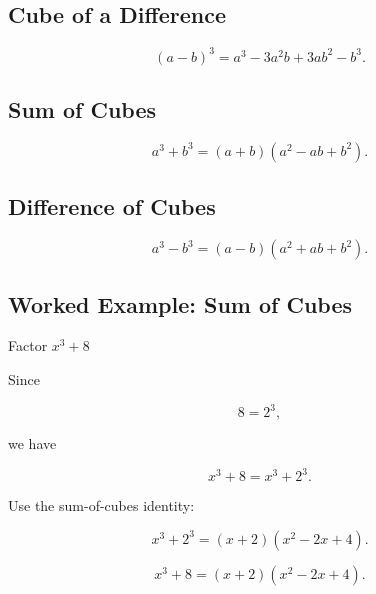 \subsection{Cube of a Difference}
\label{subsec:cube-of-difference}

\[
\boxed{
(a-b)^3
=
a^3-3a^2b+3ab^2-b^3.
}
\]

\subsection{Sum of Cubes}
\label{subsec:sum-of-cubes}

\[
\boxed{
a^3+b^3
=
(a+b)
(a^2-ab+b^2).
}
\]

\subsection{Difference of Cubes}
\label{subsec:difference-of-cubes}

\[
\boxed{
a^3-b^3
=
(a-b)
(a^2+ab+b^2).
}
\]

\subsection{Worked Example: Sum of Cubes}
\label{subsec:worked-sum-cubes}

\begin{workedexamplebox}{Factor \(x^3+8\)}

Since

\[
8=2^3,
\]

we have

\[
x^3+8
=
x^3+2^3.
\]

Use the sum-of-cubes identity:

\[
x^3+2^3
=
(x+2)(x^2-2x+4).
\]

\begin{answerbox}
\[
\boxed{
x^3+8
=
(x+2)(x^2-2x+4).
}
\]
\end{answerbox}

\end{workedexamplebox}

